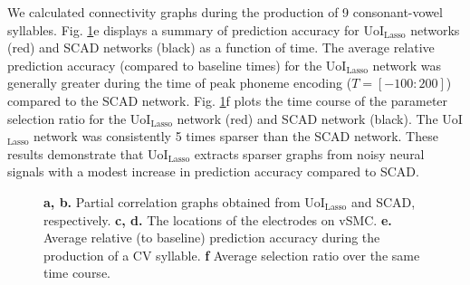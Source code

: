 \documentclass[letterpaper, 10 pt, conference]{ieeeconf}  %
\begin{document}
We calculated connectivity graphs during the production of 9 consonant-vowel syllables. Fig. \ref{fig:vsmc}e displays a summary of prediction accuracy for UoI$_{\text{Lasso}}$ networks (red) and SCAD networks (black) as a function of time. The average relative prediction accuracy (compared to baseline times) for the UoI$_{\text{Lasso}}$ network was generally greater during the time of peak phoneme encoding ($T = \left[-100:200\right]$) compared to the SCAD network. Fig. \ref{fig:vsmc}f plots the time course of the parameter selection ratio for the UoI$_{\text{Lasso}}$ network (red) and SCAD network (black). The UoI$_{\text{Lasso}}$ network was consistently 5 times sparser than the SCAD network. These results demonstrate that UoI$_{\text{Lasso}}$ extracts sparser graphs from noisy neural signals with a modest increase in prediction accuracy compared to SCAD.

\begin{figure}[t]
    \centering
    \vspace{-10pt}
    \caption{\textbf{a, b.} Partial correlation graphs obtained from UoI$_{\text{Lasso}}$ and SCAD, respectively. \textbf{c, d.} The locations of the electrodes on vSMC. \textbf{e.} Average relative (to baseline) prediction accuracy during the production of a CV syllable. \textbf{f} Average selection ratio over the same time course.}
    \label{fig:vsmc}
    \vspace{-15pt}
\end{figure}
\end{document}

